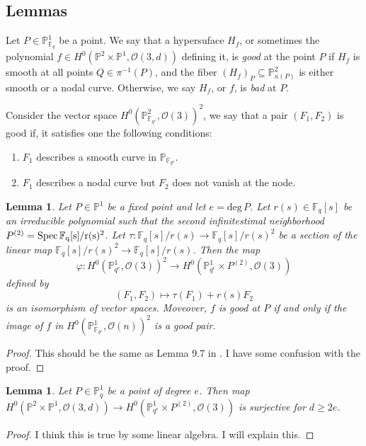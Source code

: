 \documentclass[12pt]{article}
\theoremstyle{plain}
\newtheorem{lemma}[equation]{Lemma}
\theoremstyle{definition}
\newcommand{\IF}{\mathbb{F}}
\newcommand{\IP}{\mathbb{P}}
\newcommand{\sO}{\mathcal{O}}
\renewcommand{\deg}{\mathrm{deg}\,}
\newcommand{\Spec}{\rm Spec\,}
\newcommand{\<}{\langle}
\renewcommand{\>}{\rangle}
\begin{document}
\subsection{Lemmas}
Let $P \in \IP^1_{\IF_q}$ be a point. We say that a hypersuface $H_f$, or sometimes the polynomial $f \in H^0(\IP^2 \times \IP^1, \sO(3, d))$ defining it, is \textit{good} at the point $P$ if $H_f$ is smooth at all points $Q \in \pi^{-1}(P)$, and the fiber $(H_f)_P \subseteq \IP^2_{\kappa(P)}$ is either smooth or a nodal curve. Otherwise, we say $H_f$, or $f$, is \textit{bad} at $P$.  

Consider the vector space $H^0(\IP^2_{\IF_{q^e}}, \sO(3))^2$, we say that a pair $(F_1, F_2)$ is good if, it satisfies one the following conditions:
\begin{enumerate}
\item $F_1$ describes a smooth curve in $\IP_{\IF_{q^e}}$.
\item $F_1$ describes a nodal curve but $F_2$ does not vanish at the node.
\end{enumerate}  
\begin{lemma}
Let $P \in \IP^1$ be a fixed point and let $e = \deg P$. Let $r(s) \in \IF_q[s]$ be an irreducible polynomial such that the second infinitestimal neighborhood $P^{(2)} = \Spec \IF_q[s]/r(s)^2$. Let $\tau : \IF_q[s]/r(s) \to \IF_q[s]/r(s)^2$ be a section of the linear map $\IF_q[s]/r(s)^2 \to \IF_q[s]/r(s)$. Then the map
$$ \varphi : H^0(\IP^1_{q^e} , \sO(3))^2 \to H^0(\IP^1_{q^e} \times P^{(2)}, \sO(3))$$ defined by 
$$ (F_1, F_2) \mapsto \tau(F_1) + r(s) F_2 $$
is an isomorphism of vector spaces. Moveover, $f$ is good at $P$ if and only if the image of $f$ in $H^0(\IP^1_{\IF_{q^e}} , \sO(n))^2$ is a good pair. 
\end{lemma}
\begin{proof}
This should be the same as Lemma 9.7 in \cite{Wood}. I have some confusion with the proof.
\end{proof}
\begin{lemma}
\label{pointsurj}
Let $P \in \IP^1_q$ be a point of degree $e$. Then map $H^0(\IP^2 \times \IP^1, \sO(3, d)) \to H^0(\IP^1_{q^e} \times P^{(2)}, \sO(3))$ is surjective for $d \ge 2e$. 
\end{lemma}
\begin{proof}
I think this is true by some linear algebra. I will explain this. 
\end{proof}
\end{document}
